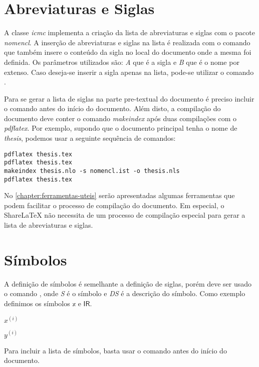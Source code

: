 \section{Abreviaturas e Siglas}

A classe \textit{icmc} implementa a criação da lista de abreviaturas e siglas com o pacote \textit{nomencl}. A inserção de abreviaturas e siglas na lista é realizada com o comando  que também insere o conteúdo da sigla no local do documento onde a mesma foi definida. Os parâmetros utilizados são: \textit{A} que é a sigla e \textit{B} que é o nome por extenso. Caso deseja-se inserir a sigla apenas na lista, pode-se utilizar o comando .

Para se gerar a lista de siglas na parte pre-textual do documento é preciso incluir o comando  antes do início do documento. Além disto, a compilação do documento deve conter o comando \textit{makeindex} após duas compilações com o \textit{pdflatex}. Por exemplo, supondo que o documento principal tenha o nome de \textit{thesis}, podemos usar a seguinte sequência de comandos:

\begin{verbatim}
pdflatex thesis.tex
pdflatex thesis.tex
makeindex thesis.nlo -s nomencl.ist -o thesis.nls
pdflatex thesis.tex
\end{verbatim}

No \autoref{chapter:ferramentas-uteis} serão apresentadas algumas ferramentas que podem facilitar o processo de compilação do documento. Em especial, o ShareLaTeX não necessita de um processo de compilação especial para gerar a lista de abreviaturas e siglas.


\section{Símbolos}

A definição de símbolos é semelhante a definição de siglas, porém deve ser usado o comando , onde \textit{S} é o símbolo e \textit{DS} é a descrição do símbolo. Como exemplo definimos os símbolos $\mathbb{x}$ e $\mathsf{I\!R}$. 

${x^{(i)}}$

${y^{(i)}}$


Para incluir a lista de símbolos, basta usar o comando  antes do início do documento.
